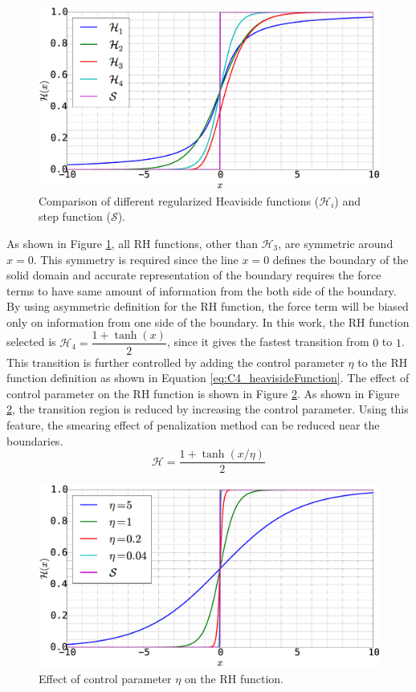 \begin{figure}[H]
    \centering
    \includegraphics[width=12.00cm]{Chapter_4/figure/heaviside_function_example.eps}
    \caption{Comparison of different regularized Heaviside functions ($\mathcal{H}_i$) and step function ($\mathcal{S}$).}
    \label{fig:C4_heavisideFunctionExample}
\end{figure}
%
As shown in Figure \ref{fig:C4_heavisideFunctionExample}, all RH functions, other than $\mathcal{H}_3$, are symmetric around $x = 0$. This symmetry is required since the line $x = 0$ defines the boundary of the solid domain and accurate representation of the boundary requires the force terms to have same amount of information from the both side of the boundary. By using asymmetric definition for the RH function, the force term will be biased only on information from one side of the boundary. In this work, the RH function selected is $\mathcal{H}_4 = \dfrac{1 + \tanh(x)}{2}$, since it gives the fastest transition from $0$ to $1$. This transition is further controlled by adding the control parameter $\eta$ to the RH function definition as shown in Equation \eqref{eq:C4_heavisideFunction}. The effect of control parameter on the RH function is shown in Figure \ref{fig:C4_heavisideFunctionWithControlParamter}. As shown in Figure \ref{fig:C4_heavisideFunctionWithControlParamter}, the transition region is reduced by increasing the control parameter. Using this feature, the smearing effect of penalization method can be reduced near the boundaries.
%
\begin{equation}\label{eq:C4_heavisideFunction}
    \mathcal{H} = \frac{1 + \tanh(x / \eta)}{2}
\end{equation}
%
%
\begin{figure}[H]
    \centering
    \includegraphics[width=12.00cm]{Chapter_4/figure/heaviside_function_with_control.eps}
    \caption{Effect of control parameter $\eta$ on the RH function.}
    \label{fig:C4_heavisideFunctionWithControlParamter}
\end{figure}
